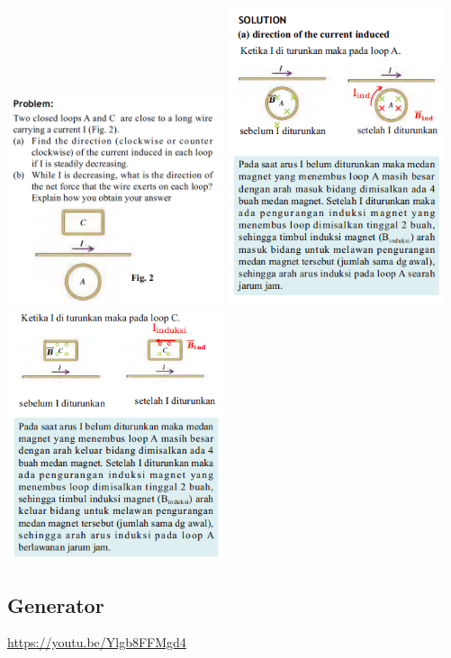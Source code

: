 \documentclass[twocolumn, 11pt]{article}%
\begin{document}
\begin{center}
    \includegraphics[width=240px]{13.png}
    \includegraphics[width=240px]{14.png}
    \includegraphics[width=240px]{15.png}
\end{center}

\subsection{Generator}%
\begin{center}
    \url{https://youtu.be/Ylgb8FFMgd4}
\end{center}
\end{document}
